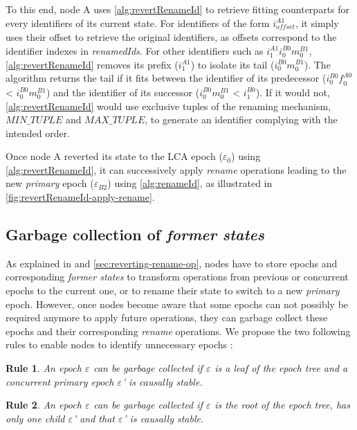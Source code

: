 \documentclass[10pt,journal,compsoc]{IEEEtran}
\newtheorem{myrule}{Rule}
\newcommand{\trm}[1]{\mathit{#1}}
\newcommand{\id}[3]{$\trm{#1}^{\trm{#2}}_{\trm{#3}}$}
\newcommand{\epoch}[1]{$\varepsilon_{#1}$}
\begin{document}
To this end, node A uses \autoref{alg:revertRenameId} to retrieve fitting counterparts for every identifiers of its current state.
For identifiers of the form \id{i}{A1}{offset}, it simply uses their offset to retrieve the original identifiers, as offsets correspond to the identifier indexes in \emph{renamedIds}.
For other identifiers such as \id{i}{A1}{1}\id{i}{B0}{0}\id{m}{B1}{0}, \autoref{alg:revertRenameId} removes its prefix (\id{i}{A1}{1}) to isolate its tail (\id{i}{B0}{0}\id{m}{B1}{0}).
The algorithm returns the tail if it fits between the identifier of its predecessor (\id{i}{B0}{0}\id{f}{A0}{0} < \id{i}{B0}{0}\id{m}{B1}{0}) and the identifier of its successor (\id{i}{B0}{0}\id{m}{B1}{0} < \id{i}{B0}{1}).
If it would not, \autoref{alg:revertRenameId} would use exclusive tuples of the renaming mechanism, $\trm{MIN\_TUPLE}$ and $\trm{MAX\_TUPLE}$, to generate an identifier complying with the intended order.

Once node A reverted its state to the LCA epoch (\epoch{0}) using \autoref{alg:revertRenameId}, it can successively apply \emph{rename} operations leading to the new \emph{primary} epoch (\epoch{B2}) using \autoref{alg:renameId}, as illustrated in \autoref{fig:revertRenameId-apply-rename}.

\subsection{Garbage collection of \emph{former states}}

As explained in \cite{nicolas:hal-02526724} and \autoref{sec:reverting-rename-op}, nodes have to store epochs and corresponding \emph{former states} to transform operations from previous or concurrent epochs to the current one, or to rename their state to switch to a new \emph{primary} epoch.
However, once nodes become aware that some epochs can not possibly be required anymore to apply future operations, they can garbage collect these epochs and their corresponding \emph{rename} operations.
We propose the two following rules to enable nodes to identify unnecessary epochs :

\begin{myrule}
    \label{rule:gc-concurrent-primary-epoch}
    An epoch \epoch{} can be garbage collected if \epoch{} is a leaf of the epoch tree and a concurrent primary epoch \epoch{}' is causally stable.
\end{myrule}

\begin{myrule}
    \label{rule:gc-root}
    An epoch \epoch{} can be garbage collected if \epoch{} is the root of the epoch tree, has only one child \epoch{}' and that \epoch{}' is causally stable.
\end{myrule}
\end{document}
